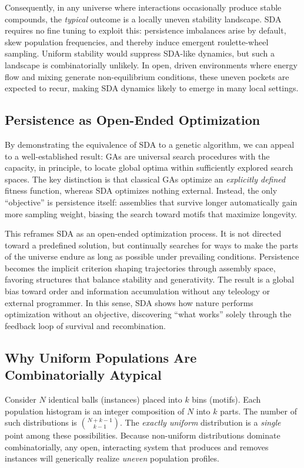 \documentclass[life,article,submit,pdftex,moreauthors]{Definitions/mdpi}
\begin{document}
Consequently, in any universe where interactions occasionally produce stable compounds,
the \emph{typical} outcome is a locally uneven stability landscape. SDA requires no
fine tuning to exploit this: persistence imbalances arise by default, skew population
frequencies, and thereby induce emergent roulette-wheel sampling. Uniform stability
would suppress SDA-like dynamics, but such a landscape is combinatorially unlikely.
In open, driven environments where energy flow and mixing generate non-equilibrium
conditions, these uneven pockets are expected to recur, making SDA dynamics likely
to emerge in many local settings.


\subsection{Persistence as Open-Ended Optimization}

By demonstrating the equivalence of SDA to a genetic algorithm, we can appeal to a
well-established result: GAs are universal search procedures with the capacity,
in principle, to locate global optima within sufficiently explored search spaces.
The key distinction is that classical GAs optimize an \textit{explicitly defined}
fitness function, whereas SDA optimizes nothing external. Instead, the only
“objective” is persistence itself: assemblies that survive longer automatically
gain more sampling weight, biasing the search toward motifs that maximize
longevity.  

This reframes SDA as an open-ended optimization process. It is not directed toward
a predefined solution, but continually searches for ways to make the parts of the
universe endure as long as possible under prevailing conditions. Persistence
becomes the implicit criterion shaping trajectories through assembly space,
favoring structures that balance stability and generativity. The result is a
global bias toward order and information accumulation without any teleology or
external programmer. In this sense, SDA shows how nature performs optimization
without an objective, discovering “what works” solely through the feedback loop
of survival and recombination.


\subsection{Why Uniform Populations Are Combinatorially Atypical}

Consider $N$ identical balls (instances) placed into $k$ bins (motifs). Each population histogram is an integer composition of $N$ into $k$ parts. The number of such distributions is $\binom{N+k-1}{k-1}$. The \emph{exactly uniform} distribution is a \emph{single} point among these possibilities. Because non-uniform distributions dominate combinatorially, any open, interacting system that produces and removes instances will generically realize \emph{uneven} population profiles.
\end{document}
